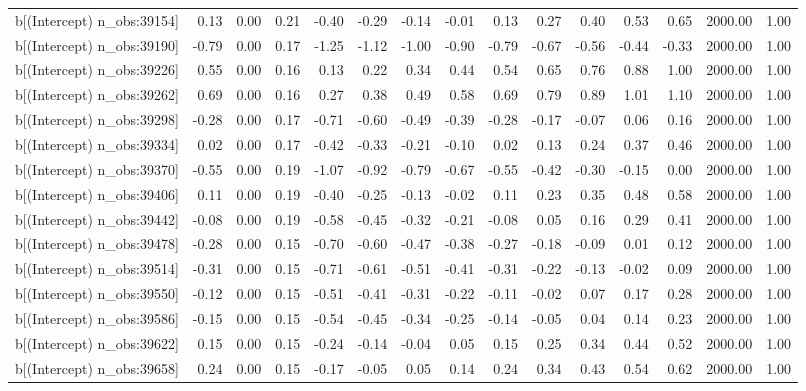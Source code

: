 \begin{table}[ht]
\begin{tabular}{rrrrrrrrrrrrrrr}
  b[(Intercept) n\_obs:39154] & 0.13 & 0.00 & 0.21 & -0.40 & -0.29 & -0.14 & -0.01 & 0.13 & 0.27 & 0.40 & 0.53 & 0.65 & 2000.00 & 1.00 \\ 
  b[(Intercept) n\_obs:39190] & -0.79 & 0.00 & 0.17 & -1.25 & -1.12 & -1.00 & -0.90 & -0.79 & -0.67 & -0.56 & -0.44 & -0.33 & 2000.00 & 1.00 \\ 
  b[(Intercept) n\_obs:39226] & 0.55 & 0.00 & 0.16 & 0.13 & 0.22 & 0.34 & 0.44 & 0.54 & 0.65 & 0.76 & 0.88 & 1.00 & 2000.00 & 1.00 \\ 
  b[(Intercept) n\_obs:39262] & 0.69 & 0.00 & 0.16 & 0.27 & 0.38 & 0.49 & 0.58 & 0.69 & 0.79 & 0.89 & 1.01 & 1.10 & 2000.00 & 1.00 \\ 
  b[(Intercept) n\_obs:39298] & -0.28 & 0.00 & 0.17 & -0.71 & -0.60 & -0.49 & -0.39 & -0.28 & -0.17 & -0.07 & 0.06 & 0.16 & 2000.00 & 1.00 \\ 
  b[(Intercept) n\_obs:39334] & 0.02 & 0.00 & 0.17 & -0.42 & -0.33 & -0.21 & -0.10 & 0.02 & 0.13 & 0.24 & 0.37 & 0.46 & 2000.00 & 1.00 \\ 
  b[(Intercept) n\_obs:39370] & -0.55 & 0.00 & 0.19 & -1.07 & -0.92 & -0.79 & -0.67 & -0.55 & -0.42 & -0.30 & -0.15 & 0.00 & 2000.00 & 1.00 \\ 
  b[(Intercept) n\_obs:39406] & 0.11 & 0.00 & 0.19 & -0.40 & -0.25 & -0.13 & -0.02 & 0.11 & 0.23 & 0.35 & 0.48 & 0.58 & 2000.00 & 1.00 \\ 
  b[(Intercept) n\_obs:39442] & -0.08 & 0.00 & 0.19 & -0.58 & -0.45 & -0.32 & -0.21 & -0.08 & 0.05 & 0.16 & 0.29 & 0.41 & 2000.00 & 1.00 \\ 
  b[(Intercept) n\_obs:39478] & -0.28 & 0.00 & 0.15 & -0.70 & -0.60 & -0.47 & -0.38 & -0.27 & -0.18 & -0.09 & 0.01 & 0.12 & 2000.00 & 1.00 \\ 
  b[(Intercept) n\_obs:39514] & -0.31 & 0.00 & 0.15 & -0.71 & -0.61 & -0.51 & -0.41 & -0.31 & -0.22 & -0.13 & -0.02 & 0.09 & 2000.00 & 1.00 \\ 
  b[(Intercept) n\_obs:39550] & -0.12 & 0.00 & 0.15 & -0.51 & -0.41 & -0.31 & -0.22 & -0.11 & -0.02 & 0.07 & 0.17 & 0.28 & 2000.00 & 1.00 \\ 
  b[(Intercept) n\_obs:39586] & -0.15 & 0.00 & 0.15 & -0.54 & -0.45 & -0.34 & -0.25 & -0.14 & -0.05 & 0.04 & 0.14 & 0.23 & 2000.00 & 1.00 \\ 
  b[(Intercept) n\_obs:39622] & 0.15 & 0.00 & 0.15 & -0.24 & -0.14 & -0.04 & 0.05 & 0.15 & 0.25 & 0.34 & 0.44 & 0.52 & 2000.00 & 1.00 \\ 
  b[(Intercept) n\_obs:39658] & 0.24 & 0.00 & 0.15 & -0.17 & -0.05 & 0.05 & 0.14 & 0.24 & 0.34 & 0.43 & 0.54 & 0.62 & 2000.00 & 1.00 \\ 

\end{tabular}
\end{table}
